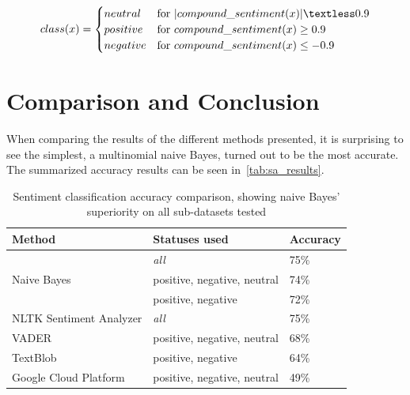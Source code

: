 \begin{equation}
    class(x) =
    \begin{cases}
        neutral & \text{for } |compound\_sentiment(x)| \textless 0.9 \\
        positive & \text{for } compound\_sentiment(x) \geq 0.9 \\
        negative & \text{for } compound\_sentiment(x) \leq -0.9 \\
    \end{cases}
\end{equation}

\section{Comparison and Conclusion}
\label{sec:comparison}

When comparing the results of the different methods presented, it is surprising to see the simplest,
a multinomial naive Bayes, turned out to be the most accurate.
The summarized accuracy results can be seen in~\autoref{tab:sa_results}. \\

\begin{table}
    \caption{Sentiment classification accuracy comparison, showing naive Bayes' superiority on all sub-datasets tested}
    \label{tab:sa_results}
    \centering
    \begin{tabular}{lll} %
        \toprule
        Method
        & Statuses used
        & Accuracy
        \\\midrule
        & \textit{all} & 75\%
        \\\cmidrule{2-3}
        Naive Bayes & positive, negative, neutral & 74\%
        \\\cmidrule{2-3}
        & positive, negative & 72\%
        \\\midrule
        NLTK Sentiment Analyzer & \textit{all} & 75\%
        \\\midrule
        VADER & positive, negative, neutral & 68\%
        \\\midrule
        TextBlob & positive, negative & 64\%
        \\\midrule
        Google Cloud Platform & positive, negative, neutral & 49\%
        \\\bottomrule
    \end{tabular}
\end{table}

